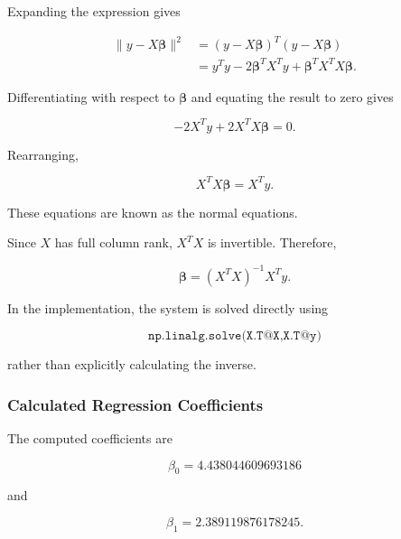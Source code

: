 \documentclass[12pt,a4paper]{article}
\numberwithin{equation}{section}
\begin{document}
Expanding the expression gives

\begin{equation}
\begin{aligned}
\|y-X\boldsymbol{\beta}\|^2
&=(y-X\boldsymbol{\beta})^T
(y-X\boldsymbol{\beta})\\
&=y^Ty-2\boldsymbol{\beta}^TX^Ty
+\boldsymbol{\beta}^TX^TX\boldsymbol{\beta}.
\end{aligned}
\end{equation}

Differentiating with respect to $\boldsymbol{\beta}$
and equating the result to zero gives

\begin{equation}
-2X^Ty+2X^TX\boldsymbol{\beta}=0.
\end{equation}

Rearranging,

\begin{equation}
X^TX\boldsymbol{\beta}=X^Ty.
\end{equation}

These equations are known as the normal equations.

Since $X$ has full column rank, $X^TX$ is
invertible. Therefore,

\begin{equation}
\boxed{
\boldsymbol{\beta}
=(X^TX)^{-1}X^Ty
}.
\end{equation}

In the implementation, the system is solved directly
using

\begin{equation}
\texttt{np.linalg.solve(X.T@X,X.T@y)}
\end{equation}

rather than explicitly calculating the inverse.

\subsubsection{Calculated Regression Coefficients}

The computed coefficients are

\begin{equation}
\boxed{\beta_0=4.438044609693186}
\end{equation}

and

\begin{equation}
\boxed{\beta_1=2.389119876178245}.
\end{equation}
\end{document}
